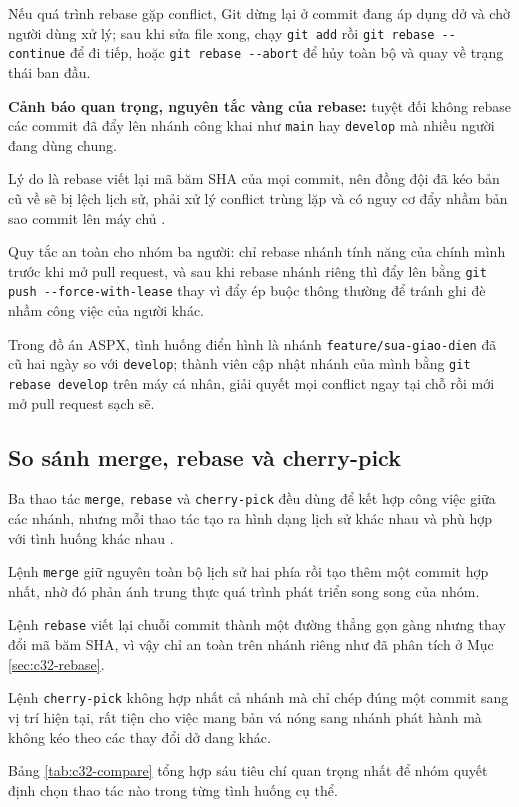 Nếu quá trình rebase gặp conflict, Git dừng lại ở commit đang áp dụng dở và chờ người dùng xử lý; sau khi sửa file xong, chạy \verb|git add| rồi \verb|git rebase --continue| để đi tiếp, hoặc \verb|git rebase --abort| để hủy toàn bộ và quay về trạng thái ban đầu.

\textbf{Cảnh báo quan trọng, nguyên tắc vàng của rebase:} tuyệt đối không rebase các commit đã đẩy lên nhánh công khai như \verb|main| hay \verb|develop| mà nhiều người đang dùng chung.

Lý do là rebase viết lại mã băm SHA của mọi commit, nên đồng đội đã kéo bản cũ về sẽ bị lệch lịch sử, phải xử lý conflict trùng lặp và có nguy cơ đẩy nhầm bản sao commit lên máy chủ \cite{progit}.

Quy tắc an toàn cho nhóm ba người: chỉ rebase nhánh tính năng của chính mình trước khi mở pull request, và sau khi rebase nhánh riêng thì đẩy lên bằng \verb|git push --force-with-lease| thay vì đẩy ép buộc thông thường để tránh ghi đè nhầm công việc của người khác.

Trong đồ án ASPX, tình huống điển hình là nhánh \verb|feature/sua-giao-dien| đã cũ hai ngày so với \verb|develop|; thành viên cập nhật nhánh của mình bằng \verb|git rebase develop| trên máy cá nhân, giải quyết mọi conflict ngay tại chỗ rồi mới mở pull request sạch sẽ.

\subsection{So sánh merge, rebase và cherry-pick}
\label{sec:c32-compare}

Ba thao tác \verb|merge|, \verb|rebase| và \verb|cherry-pick| đều dùng để kết hợp công việc giữa các nhánh, nhưng mỗi thao tác tạo ra hình dạng lịch sử khác nhau và phù hợp với tình huống khác nhau \cite{atlassiangit}.

Lệnh \verb|merge| giữ nguyên toàn bộ lịch sử hai phía rồi tạo thêm một commit hợp nhất, nhờ đó phản ánh trung thực quá trình phát triển song song của nhóm.

Lệnh \verb|rebase| viết lại chuỗi commit thành một đường thẳng gọn gàng nhưng thay đổi mã băm SHA, vì vậy chỉ an toàn trên nhánh riêng như đã phân tích ở Mục \ref{sec:c32-rebase}.

Lệnh \verb|cherry-pick| không hợp nhất cả nhánh mà chỉ chép đúng một commit sang vị trí hiện tại, rất tiện cho việc mang bản vá nóng sang nhánh phát hành mà không kéo theo các thay đổi dở dang khác.

Bảng \ref{tab:c32-compare} tổng hợp sáu tiêu chí quan trọng nhất để nhóm quyết định chọn thao tác nào trong từng tình huống cụ thể.

